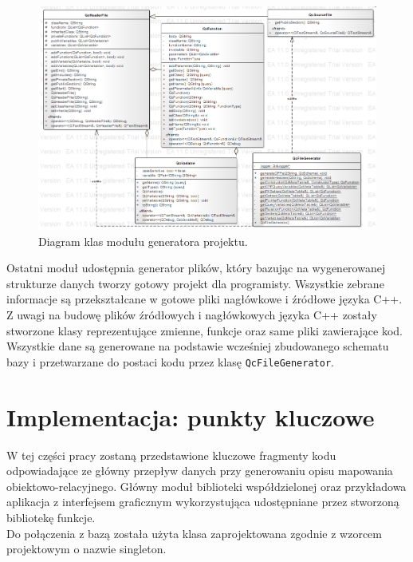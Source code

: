 \documentclass[12pt]{report}
\let\oldaddcontentsline\addcontentsline
\newcommand{\lstinputcplusplus}[2][]{{%
  \renewcommand{\lstlistingname}{C++ Code}%
  \renewcommand{\addcontentsline}[3]{\oldaddcontentsline{loc}{##2}{##3}}%
}}
\begin{document}
\begin{figure}[h]
	\centering
	\includegraphics[width=1\textwidth]{images/generator.png}
	\caption{Diagram klas modułu generatora projektu.}
\end{figure}
\FloatBarrier	

Ostatni moduł udostępnia generator plików, który bazując na wygenerowanej strukturze danych tworzy gotowy projekt dla programisty. Wszystkie zebrane informacje są przekształcane w gotowe pliki nagłówkowe i źródłowe języka C++. {\color{black} Z uwagi na budowę plików źródłowych i nagłówkowych języka C++ zostały stworzone klasy reprezentujące zmienne, funkcje oraz same pliki zawierające kod. Wszy\-stkie dane są generowane na podstawie wcześniej zbudowanego schematu bazy i przetwarzane do postaci kodu przez klasę {\tt QcFileGenerator}.}

\section{Implementacja: punkty kluczowe}
W tej części pracy zostaną przedstawione kluczowe fragmenty kodu odpowiadające ze główny przepływ danych przy generowaniu opisu mapowania obiektowo-relacyj\-nego. Główny moduł biblioteki współdzielonej oraz przykładowa aplikacja z interfejsem graficznym wykorzystująca udostępniane przez stworzoną bibliotekę funkcje. \\
	\indent Do połączenia z bazą została użyta klasa zaprojektowana zgodnie z wzorcem projektowym o nazwie singleton.
	
\begin{framed}
\lstinputcplusplus[caption={QcDatabase}]{additional/qcdatabase.h}
\end{framed}
\end{document}
